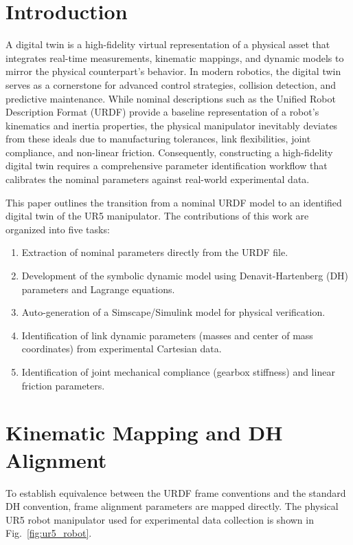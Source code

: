 \documentclass[journal]{IEEEtran}
\begin{document}
\section{Introduction}
A digital twin is a high-fidelity virtual representation of a physical asset that integrates real-time measurements, kinematic mappings, and dynamic models to mirror the physical counterpart's behavior. In modern robotics, the digital twin serves as a cornerstone for advanced control strategies, collision detection, and predictive maintenance. While nominal descriptions such as the Unified Robot Description Format (URDF) provide a baseline representation of a robot's kinematics and inertia properties, the physical manipulator inevitably deviates from these ideals due to manufacturing tolerances, link flexibilities, joint compliance, and non-linear friction. Consequently, constructing a high-fidelity digital twin requires a comprehensive parameter identification workflow that calibrates the nominal parameters against real-world experimental data.

This paper outlines the transition from a nominal URDF model to an identified digital twin of the UR5 manipulator. The contributions of this work are organized into five tasks:
\begin{enumerate}
    \item Extraction of nominal parameters directly from the URDF file.
    \item Development of the symbolic dynamic model using Denavit-Hartenberg (DH) parameters and Lagrange equations.
    \item Auto-generation of a Simscape/Simulink model for physical verification.
    \item Identification of link dynamic parameters (masses and center of mass coordinates) from experimental Cartesian data.
    \item Identification of joint mechanical compliance (gearbox stiffness) and linear friction parameters.
\end{enumerate}

\section{Kinematic Mapping and DH Alignment}
To establish equivalence between the URDF frame conventions and the standard DH convention, frame alignment parameters are mapped directly. The physical UR5 robot manipulator used for experimental data collection is shown in Fig.~\ref{fig:ur5_robot}.
\end{document}
